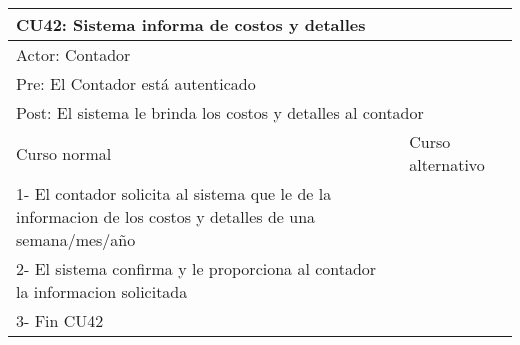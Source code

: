 \begin{table}[H]
  \begin{adjustbox}{max width = \textwidth}
  \begin{tabular}{|l|l|}
    \hline
    \multicolumn{2}{|l|}{CU42: Sistema informa de costos y detalles} \\\hline
    \multicolumn{2}{|l|}{Actor: Contador} \\\hline
    \multicolumn{2}{|l|}{Pre: El Contador está autenticado} \\\hline
    \multicolumn{2}{|l|}{Post: El sistema le brinda los costos y detalles al contador} \\\hline
     Curso normal & Curso alternativo\\ \hline
     1- El contador solicita al sistema que le de la informacion de los costos y detalles de una semana/mes/año & \\ \hline
     2- El sistema confirma y le proporciona al contador la informacion solicitada & \\ \hline
	 3- Fin CU42 & \\ \hline
  \end{tabular}
  \end{adjustbox}
\end{table}
